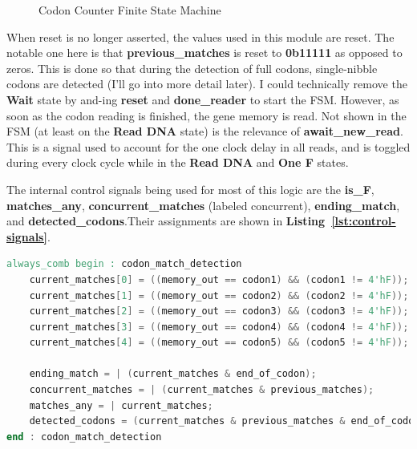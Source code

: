 \documentclass[a4paper, 12pt]{article}
\begin{document}
\begin{figure}[H]
\caption{Codon Counter Finite State Machine}
\label{fig:fsm-codon-counter}
\end{figure}

When reset is no longer asserted, the values used in this module are reset. The notable one here is that \textbf{previous\_matches} is reset to \textbf{0b11111} as opposed to zeros. This is done so that during the detection of full codons, single-nibble codons are detected (I'll go into more detail later). I could technically remove the \textbf{Wait} state by and-ing \textbf{reset} and \textbf{done\_reader} to start the FSM. However, as soon as the codon reading is finished, the gene memory is read. Not shown in the FSM (at least on the \textbf{Read DNA} state) is the relevance of \textbf{await\_new\_read}. This is a signal used to account for the one clock delay in all reads, and is toggled during every clock cycle while in the \textbf{Read DNA} and \textbf{One F} states.

The internal control signals being used for most of this logic are the \textbf{is\_F}, \textbf{matches\_any}, \textbf{concurrent\_matches} (labeled concurrent), \textbf{ending\_match}, and \textbf{detected\_codons}.Their assignments are shown in \textbf{Listing~\ref{lst:control-signals}}.

\begin{mdframed}[backgroundcolor=code-gray, roundcorner=10pt, innerleftmargin=25, innertopmargin=5, innerbottommargin=5]	
\begin{lstlisting}[nolol=True, caption=Internal Logic Signal Assignment, label={lst:control-signals}, language=Verilog]
always_comb begin : codon_match_detection
	current_matches[0] = ((memory_out == codon1) && (codon1 != 4'hF));
	current_matches[1] = ((memory_out == codon2) && (codon2 != 4'hF));
	current_matches[2] = ((memory_out == codon3) && (codon3 != 4'hF));
	current_matches[3] = ((memory_out == codon4) && (codon4 != 4'hF));
	current_matches[4] = ((memory_out == codon5) && (codon5 != 4'hF));

	ending_match = | (current_matches & end_of_codon);
	concurrent_matches = | (current_matches & previous_matches);
	matches_any = | current_matches;	
	detected_codons = (current_matches & previous_matches & end_of_codon);
end : codon_match_detection
\end{lstlisting}
\end{mdframed}
\end{document}
